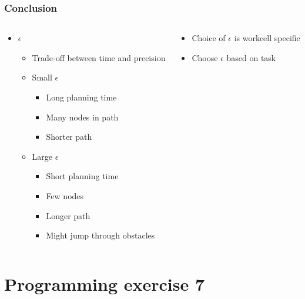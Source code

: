\documentclass{beamer}
\begin{document}
\begin{frame}
  \frametitle{Conclusion}
  \begin{columns}
    \begin{column}{0.5\textwidth}
      \begin{itemize}
      \item $\epsilon$
        \begin{itemize}
        \item Trade-off between time and precision
        \item Small $\epsilon$
          \begin{itemize}
          \item Long planning time
          \item Many nodes in path
          \item Shorter path
          \end{itemize}
        \item Large $\epsilon$
          \begin{itemize}
          \item Short planning time
          \item Few nodes
          \item Longer path
          \item Might jump through obstacles 
          \end{itemize}
        \end{itemize}
      \end{itemize}
    \end{column}
    \begin{column}{0.5\textwidth}
      \begin{itemize}
      \item Choice of $\epsilon$ is workcell specific
      \item Choose $\epsilon$ based on task
      \end{itemize}
    \end{column}
  \end{columns}
\end{frame}

\section{Programming exercise 7}
\end{document}

